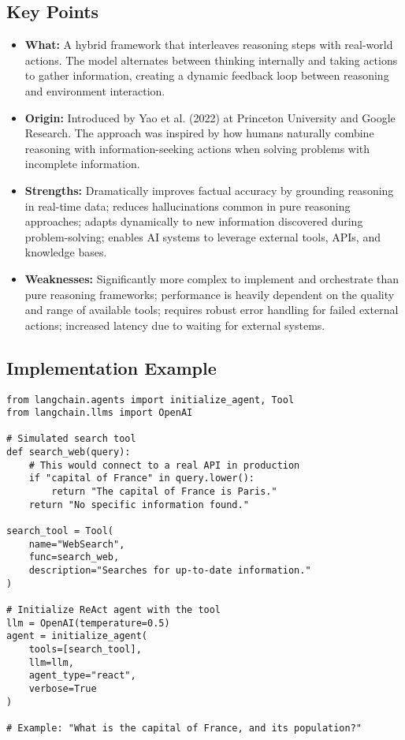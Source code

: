 \documentclass[12pt,letterpaper]{article}
\newenvironment{macterminal}{%
    \begin{mdframed}[
        linecolor=terminalFrame,
        backgroundcolor=terminalBg,
        roundcorner=5pt,
        skipabove=5pt,
        skipbelow=5pt,
        linewidth=1pt,
        innertopmargin=5pt,
        frametitle={%
            \tikz[baseline=(current bounding box.east), outer sep=0pt]{
                \fill[red!80!black] (0,0) circle (5pt);
                \fill[yellow!80!black] (0.7,0) circle (5pt);
                \fill[green!70!black] (1.4,0) circle (5pt);
            }
        },
        frametitlealignment=\raggedright,
        frametitleaboveskip=8pt,
        frametitlebelowskip=0pt,
    ]
}{%
    \end{mdframed}%
}
\begin{document}
\subsection{Key Points}
\begin{itemize}
    \item \textbf{\textcolor{pythonBlue}{What:}} A hybrid framework that interleaves reasoning steps with real-world actions. The model alternates between thinking internally and taking actions to gather information, creating a dynamic feedback loop between reasoning and environment interaction.
    
    \item \textbf{\textcolor{pythonBlue}{Origin:}} Introduced by Yao et al. (2022) at Princeton University and Google Research. The approach was inspired by how humans naturally combine reasoning with information-seeking actions when solving problems with incomplete information.
    
    \item \textbf{\textcolor{pythonBlue}{Strengths:}} Dramatically improves factual accuracy by grounding reasoning in real-time data; reduces hallucinations common in pure reasoning approaches; adapts dynamically to new information discovered during problem-solving; enables AI systems to leverage external tools, APIs, and knowledge bases.
    
    \item \textbf{\textcolor{pythonBlue}{Weaknesses:}} Significantly more complex to implement and orchestrate than pure reasoning frameworks; performance is heavily dependent on the quality and range of available tools; requires robust error handling for failed external actions; increased latency due to waiting for external systems.
\end{itemize}

\subsection{Implementation Example}

\begin{macterminal}
\begin{lstlisting}
from langchain.agents import initialize_agent, Tool
from langchain.llms import OpenAI

# Simulated search tool
def search_web(query):
    # This would connect to a real API in production
    if "capital of France" in query.lower():
        return "The capital of France is Paris."
    return "No specific information found."

search_tool = Tool(
    name="WebSearch",
    func=search_web,
    description="Searches for up-to-date information."
)

# Initialize ReAct agent with the tool
llm = OpenAI(temperature=0.5)
agent = initialize_agent(
    tools=[search_tool],
    llm=llm,
    agent_type="react",
    verbose=True
)

# Example: "What is the capital of France, and its population?"
\end{lstlisting}
\end{macterminal}
\end{document}
